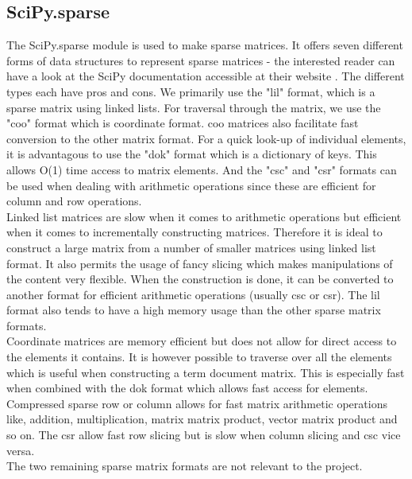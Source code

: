 \subsection{SciPy.sparse\label{SciPy_sparse}}

The SciPy.sparse module is used to make sparse matrices. It offers
seven different forms of data structures to represent sparse matrices
- the interested reader can have a look at the SciPy documentation
accessible at their website \cite{SciPy}. The different types each have pros and
cons. We primarily use the "lil" format, which is a sparse matrix
using linked lists. For traversal through the matrix, we use the "coo"
format which is coordinate format. coo matrices also facilitate fast
conversion to the other matrix format. For a quick look-up of
individual elements, it is advantagous to use the "dok" format which
is a dictionary of keys. This allows O(1) time access to matrix
elements. And the "csc" and "csr" formats can be used when dealing
with arithmetic operations since these are efficient for column and
row operations. \\

Linked list matrices are slow when it comes to arithmetic
operations but efficient when it comes to incrementally constructing
matrices. Therefore it is ideal to construct a large matrix from a
number of smaller matrices using linked list format. It also permits
the usage of fancy slicing which makes manipulations of the content
very flexible. When the construction is done, it can be converted to
another format for efficient arithmetic operations (usually csc or
csr). The lil format also tends to have a high memory usage than the
other sparse matrix formats.\\

Coordinate matrices are memory efficient but does not allow for
direct access to the elements it contains. It is however possible to
traverse over all the elements which is useful when constructing a
term document matrix. This is especially fast when combined with the
dok format which allows fast access for elements.\\

Compressed sparse row or column allows for fast matrix
arithmetic operations like, addition, multiplication, matrix matrix
product, vector matrix product and so on. The csr allow fast row
slicing but is slow when column slicing and csc vice versa.\\

The two remaining sparse matrix formats are not relevant to the
project.

